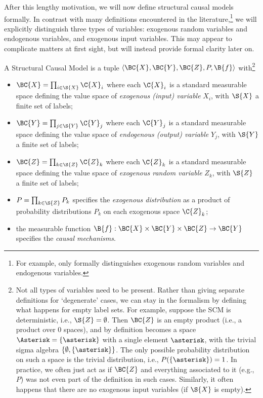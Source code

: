 After this lengthy motivation, we will now define structural causal models formally.
In contrast with many definitions encountered in the literature,\footnote{For
example, \cite{Pearl09} only formally distinguishes exogenous random variables and 
endogenous variables.} we will explicitly distinguish
three types of variables: exogenous random variables and endogenous variables, and exogenous
input variables. This may appear to complicate matters at first sight, but will instead provide 
formal clarity later on.
\begin{Def}\label{def:scm}
  A Structural Causal Model is a tuple $\langle \BC{X}, \BC{Y}, \BC{Z}, P, \B{f} \rangle$ 
  with\footnote{Not all types of variables need to be present. Rather than giving separate definitions for `degenerate' cases, we can stay in the formalism by defining what happens for empty label sets. For example, suppose the SCM is deterministic, i.e., $\S{Z} = \emptyset$. Then $\BC{Z}$ is an empty product (i.e., a product over 0 spaces), and by definition becomes a space $\Asterisk = \{\asterisk\}$ with a single element $\asterisk$, with the trivial sigma algebra $\{\emptyset,\{\asterisk\}\}$. The only possible probability distribution on such a space is the trivial distribution, i.e., $P(\{\asterisk\}) = 1$. In practice, we often just act as if $\BC{Z}$ and everything associated to it (e.g., $P$) was not even part of the definition in such cases. Similarly, it often happens that there are no exogenous input variables (if $\S{X}$ is empty).}
  \begin{itemize}
    \item $\BC{X} = \prod_{i\in\S{X}} \C{X}_i$ where each $\C{X}_i$ is a standard measurable space defining the value space of \emph{exogenous (input) variable} $X_i$, with $\S{X}$ a finite set of labels;
    \item $\BC{Y} = \prod_{j\in\S{Y}} \C{Y}_j$ where each $\C{Y}_j$ is a standard measurable space defining the value space of \emph{endogenous (output) variable} $Y_j$, with $\S{Y}$ a finite set of labels;
    \item $\BC{Z} = \prod_{k\in\S{Z}} \C{Z}_k$ where each $\C{Z}_k$ is a standard measurable space defining the value space of \emph{exogenous random variable} $Z_k$, with $\S{Z}$ a finite set of labels;
    \item $P = \prod_{k\in\S{Z}} P_k$ specifies the \emph{exogenous distribution} as a product of probability distributions $P_k$ on each exogenous space $\C{Z}_k$;
    \item the measurable function $\B{f} : \BC{X} \times \BC{Y} \times \BC{Z} \to \BC{Y}$ specifies the \emph{causal mechanisms}.
  \end{itemize}
\end{Def}
